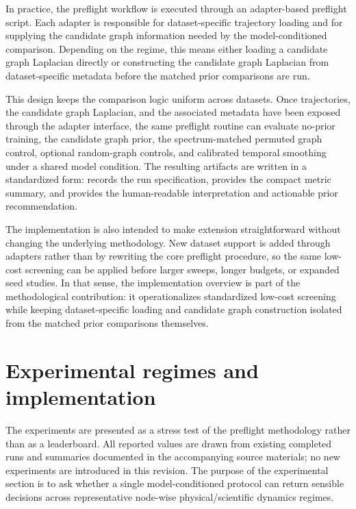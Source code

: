 \documentclass[preprint,12pt]{elsarticle}
\begin{document}
In practice, the preflight workflow is executed through an adapter-based preflight script. Each adapter is responsible for dataset-specific trajectory loading and for supplying the candidate graph information needed by the model-conditioned comparison. Depending on the regime, this means either loading a candidate graph Laplacian directly or constructing the candidate graph Laplacian from dataset-specific metadata before the matched prior comparisons are run.

This design keeps the comparison logic uniform across datasets. Once trajectories, the candidate graph Laplacian, and the associated metadata have been exposed through the adapter interface, the same preflight routine can evaluate no-prior training, the candidate graph prior, the spectrum-matched permuted graph control, optional random-graph controls, and calibrated temporal smoothing under a shared model condition. The resulting artifacts are written in a standardized form:  records the run specification,  provides the compact metric summary, and  provides the human-readable interpretation and actionable prior recommendation.

The implementation is also intended to make extension straightforward without changing the underlying methodology. New dataset support is added through adapters rather than by rewriting the core preflight procedure, so the same low-cost screening can be applied before larger sweeps, longer budgets, or expanded seed studies. In that sense, the implementation overview is part of the methodological contribution: it operationalizes standardized low-cost screening while keeping dataset-specific loading and candidate graph construction isolated from the matched prior comparisons themselves.

\FloatBarrier

\section{Experimental regimes and implementation}

The experiments are presented as a stress test of the preflight methodology rather than as a leaderboard. All reported values are drawn from existing completed runs and summaries documented in the accompanying source materials; no new experiments are introduced in this revision. The purpose of the experimental section is to ask whether a single model-conditioned protocol can return sensible decisions across representative node-wise physical/scientific dynamics regimes.
\end{document}
